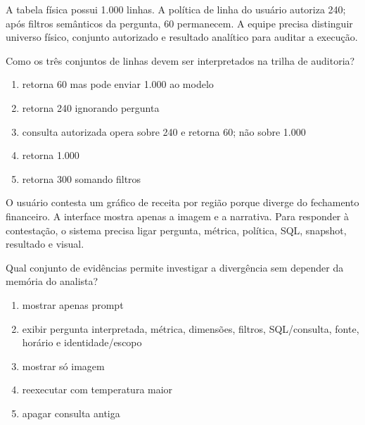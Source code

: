 
\TextoBase

A tabela física possui 1.000 linhas. A política de linha do usuário autoriza 240; após filtros semânticos da pergunta, 60 permanecem. A equipe precisa distinguir universo físico, conjunto autorizado e resultado analítico para auditar a execução.

\FonteDidatica

\Comando Como os três conjuntos de linhas devem ser interpretados na trilha de auditoria?

\begin{enumerate}[label=\Alph*)]

\item retorna 60 mas pode enviar 1.000 ao modelo

\item retorna 240 ignorando pergunta

\item consulta autorizada opera sobre 240 e retorna 60; não sobre 1.000

\item retorna 1.000

\item retorna 300 somando filtros

\end{enumerate}


\TextoBase

O usuário contesta um gráfico de receita por região porque diverge do fechamento financeiro. A interface mostra apenas a imagem e a narrativa. Para responder à contestação, o sistema precisa ligar pergunta, métrica, política, SQL, snapshot, resultado e visual.

\FonteDidatica

\Comando Qual conjunto de evidências permite investigar a divergência sem depender da memória do analista?

\begin{enumerate}[label=\Alph*)]

\item mostrar apenas prompt

\item exibir pergunta interpretada, métrica, dimensões, filtros, SQL/consulta, fonte, horário e identidade/escopo

\item mostrar só imagem

\item reexecutar com temperatura maior

\item apagar consulta antiga

\end{enumerate}

